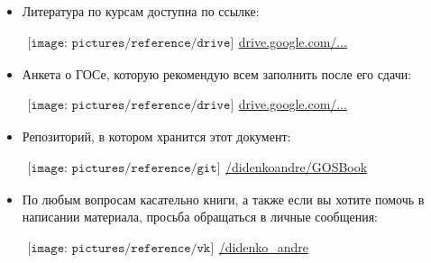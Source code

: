 \begin{flushleft}
\begin{itemize}[wide, labelwidth=!, labelindent=0pt, label=$\blacktriangleright$, noitemsep]
\item Литература по курсам доступна по ссылке:

\qquad\href{https://drive.google.com/drive/u/0/folders/0BzuzEyNkpwYDcENXcV9jNWdwVlU}{$
\begin{array}{l}
\texttt{[image: pictures/reference/drive]}
\end{array}
$\large drive.google.com/...}

\item Анкета о ГОСе, которую рекомендую всем заполнить после его сдачи:

\qquad\href{https://docs.google.com/spreadsheets/d/10jIg9Nr5oM1-Zjo_iIlKs8uxrBKrzfuJNas_YJIIxPs/edit\#gid=0}{$
\begin{array}{l}
\texttt{[image: pictures/reference/drive]}
\end{array}
$\large drive.google.com/...}

\iffalse
\item Подпишитесь на наш Telegram-бот с помощью команды \textsf{/subscribe}, и вы будете получать свежую версию автоматически!

\qquad\href{https://t.me/gosbook_bot}{$
\begin{array}{l}
\texttt{[image: pictures/reference/telegram]}
\end{array}
$\large /GOSBook\_Bot} 
\fi

\item Репозиторий, в котором хранится этот документ:

\qquad\href{https://github.com/DidenkoAndre/GOSBook}{$
\begin{array}{l}
\texttt{[image: pictures/reference/git]}
\end{array}
$\large /didenkoandre/GOSBook}

\iffalse
\item Вы всегда можете поддержать проект материально! 
Перевести средства на развитие проекта можно на карту {\large 5244 6873 8510 3816} \textsf{(MasterCard)}.
\fi

\item По любым вопросам касательно книги, а также если вы хотите помочь в написании материала, просьба обращаться в личные сообщения: 

\qquad\href{https://vk.com/didenko_andre}{$
\begin{array}{l}
\texttt{[image: pictures/reference/vk]}
\end{array}
$\large /didenko\_\!andre}


\end{itemize}
\end{flushleft}
